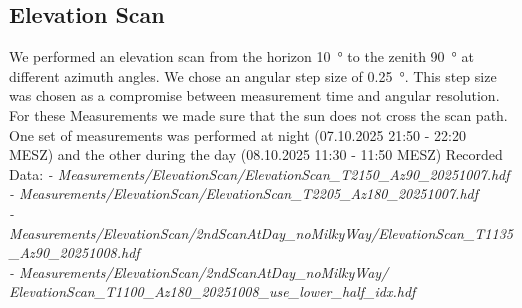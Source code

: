 \subsection{Elevation Scan}
We performed an elevation scan from the horizon \SI{10}{\degree} to the zenith \SI{90}{\degree} at different  azimuth angles.
We chose an angular step size of \SI{0.25}{\degree}. This step size was chosen as a compromise between measurement time and angular resolution.
For these Measurements we made sure that the sun does not cross the scan path.
One set of measurements was performed at night (07.10.2025 21:50 - 22:20 MESZ) and the other during the day (08.10.2025 11:30 - 11:50 MESZ)
Recorded Data:
\textit{
- Measurements/ElevationScan/ElevationScan\_T2150\_Az90\_20251007.hdf\\
- Measurements/ElevationScan/ElevationScan\_T2205\_Az180\_20251007.hdf\\
- Measurements/ElevationScan/2ndScanAtDay\_noMilkyWay/ElevationScan\_T1135\_Az90\_20251008.hdf\\
- Measurements/ElevationScan/2ndScanAtDay\_noMilkyWay/\\
\phantom{- Measurements/}ElevationScan\_T1100\_Az180\_20251008\_use\_lower\_half\_idx.hdf\\
}
